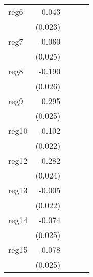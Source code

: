 {\begin{longtable}{l*{4}{D{.}{.}{-1}}}
\addlinespace
reg6        &       0.043         &                     &                     &                     \\
            &     (0.023)         &                     &                     &                     \\
\addlinespace
reg7        &      -0.060\sym{*}  &                     &                     &                     \\
            &     (0.025)         &                     &                     &                     \\
\addlinespace
reg8        &      -0.190\sym{***}&                     &                     &                     \\
            &     (0.026)         &                     &                     &                     \\
\addlinespace
reg9        &       0.295\sym{***}&                     &                     &                     \\
            &     (0.025)         &                     &                     &                     \\
\addlinespace
reg10       &      -0.102\sym{***}&                     &                     &                     \\
            &     (0.022)         &                     &                     &                     \\
\addlinespace
reg12       &      -0.282\sym{***}&                     &                     &                     \\
            &     (0.024)         &                     &                     &                     \\
\addlinespace
reg13       &      -0.005         &                     &                     &                     \\
            &     (0.022)         &                     &                     &                     \\
\addlinespace
reg14       &      -0.074\sym{**} &                     &                     &                     \\
            &     (0.025)         &                     &                     &                     \\
\addlinespace
reg15       &      -0.078\sym{**} &                     &                     &                     \\
            &     (0.025)         &                     &                     &                     \\

\end{longtable}}
